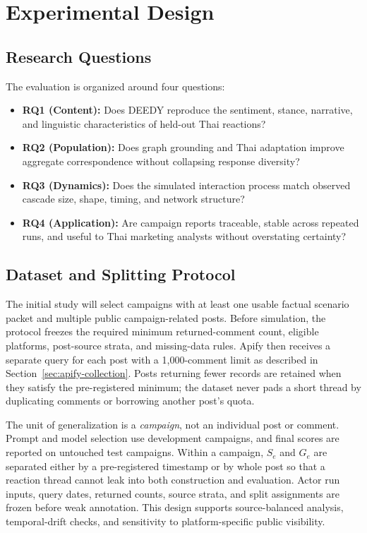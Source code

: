 \documentclass[conference]{IEEEtran}
\begin{document}
\section{Experimental Design}

\subsection{Research Questions}

The evaluation is organized around four questions:
\begin{itemize}
    \item \textbf{RQ1 (Content):} Does DEEDY reproduce the sentiment, stance,
    narrative, and linguistic characteristics of held-out Thai reactions?
    \item \textbf{RQ2 (Population):} Does graph grounding and Thai adaptation
    improve aggregate correspondence without collapsing response diversity?
    \item \textbf{RQ3 (Dynamics):} Does the simulated interaction process match
    observed cascade size, shape, timing, and network structure?
    \item \textbf{RQ4 (Application):} Are campaign reports traceable, stable
    across repeated runs, and useful to Thai marketing analysts without
    overstating certainty?
\end{itemize}

\subsection{Dataset and Splitting Protocol}

The initial study will select campaigns with at least one usable factual
scenario packet and multiple public campaign-related posts. Before simulation,
the protocol freezes the required minimum returned-comment count, eligible
platforms, post-source strata, and missing-data rules. Apify then receives a
separate query for each post with a 1,000-comment limit as described in
Section~\ref{sec:apify-collection}. Posts returning fewer records are retained
when they satisfy the pre-registered minimum; the dataset never pads a short
thread by duplicating comments or borrowing another post's quota.

The unit of generalization is a \emph{campaign}, not an individual post or
comment. Prompt and model selection use development campaigns, and final
scores are reported on untouched test campaigns. Within a campaign, $S_e$ and
$G_e$ are separated either by a pre-registered timestamp or by whole post so
that a reaction thread cannot leak into both construction and evaluation.
Actor run inputs, query dates, returned counts, source strata, and split
assignments are frozen before weak annotation. This design supports
source-balanced analysis, temporal-drift checks, and sensitivity to
platform-specific public visibility.
\end{document}
